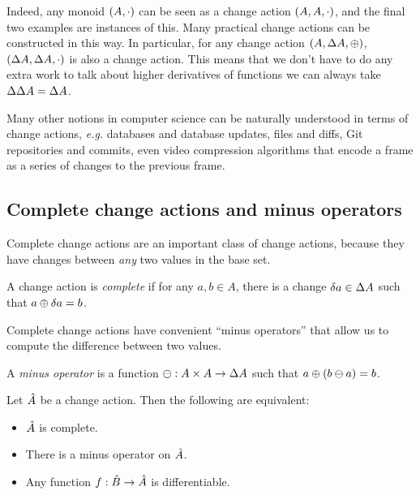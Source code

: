 Indeed, any monoid $(A, \cdot)$ can be seen as a change action
$(A,A,\cdot)$, and the final two examples are instances of this. Many practical change actions
can be constructed in this way. In particular, for any change action $(A,\Delta A,\oplus)$,
$(\Delta A,\Delta A,\cdot)$ is also a change action. This means
that we don't have to do any extra work to talk about higher derivatives of
functions \textemdash we can always take $\Delta \Delta A = \Delta A$.

Many other notions in computer science can be naturally understood in terms of change actions, \emph{e.g.} databases
and database updates, files and diffs, Git repositories and commits, even video compression
algorithms that encode a frame as a series of changes to the previous frame.

\subsection{Complete change actions and minus operators}

Complete change actions are an important class of change actions, because they
have changes between \emph{any} two values in the base set.

\begin{defn}
  A change action is \emph{complete} if for any $a, b \in A$, there is
  a change $\delta a \in \Delta A$ such that $a \oplus \delta a = b$.
\end{defn}

Complete change actions have convenient ``minus operators'' that allow us to
compute the difference between two values.

\begin{defn}
  A \emph{minus operator} is a function $\ominus: A \times A \rightarrow \Delta A$ such that $a \oplus (b \ominus a) = b$.
\end{defn}

\begin{prop}
  Let $\hat{A}$ be a change action. Then the following are equivalent:
  \begin{itemize}
    \item $\hat{A}$ is complete.
    \item There is a minus operator on $\hat{A}$.
    \item Any function $f: \hat{B} \rightarrow \hat{A}$ is differentiable.
  \end{itemize}
\end{prop}

